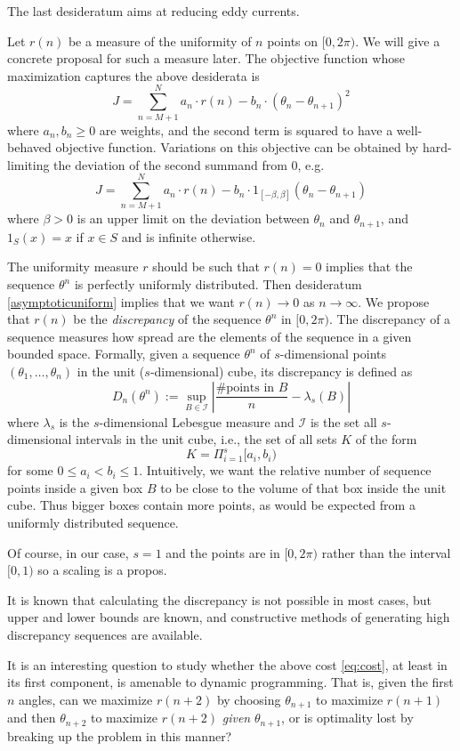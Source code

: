 The last desideratum aims at reducing eddy currents.

Let $r(n)$ be a measure of the uniformity of $n$ points on $[0,2\pi)$. 
We will give a concrete proposal for such a measure later.
The objective function whose maximization captures the above desiderata is 
\begin{equation}
\label{eq:cost}
J = \sum_{n=M+1}^{N}a_n\cdot r(n) - b_n \cdot (\theta_n - \theta_{n+1})^2
\end{equation}
where $a_n,b_n \geq 0$ are weights, and the second term is squared to have a well-behaved objective function. 
Variations on this objective can be obtained by hard-limiting the deviation of the second summand from 0, e.g. 
\[J = \sum_{n=M+1}^{N}a_n\cdot r(n) - b_n \cdot 1_{[-\beta,\beta]}  (\theta_n - \theta_{n+1})\]
where $\beta > 0$ is an upper limit on the deviation between $\theta_n$ and $\theta_{n+1}$, and $1_S(x) = x$ if $x \in S$ and is infinite otherwise.

The uniformity measure $r$ should be such that $r(n) = 0$ implies that the sequence $\theta^n$ is perfectly uniformly distributed.
Then desideratum \ref{asymptoticuniform} implies that we want $r(n) \rightarrow 0$ as $n \rightarrow \infty$.
We propose that $r(n)$ be the \emph{discrepancy} of the sequence $\theta^n$ in $[0,2\pi)$.
The discrepancy of a sequence measures how spread are the elements of the sequence in a given bounded space.
Formally, given a sequence $\theta^n $ of $s$-dimensional points $(\theta_1,\ldots,\theta_n)$ in the unit ($s$-dimensional) cube, its discrepancy is defined as 
\begin{equation}
D_n(\theta^n) := \sup_{B \in \mathcal{I}}\left|\frac{\#\textrm{points in }B}{n} - \lambda_s(B)\right|
\end{equation}
where $\lambda_s$ is the $s$-dimensional Lebesgue measure and $\mathcal{I}$ is the set all $s$-dimensional intervals in the unit cube, i.e., the set of all sets $K$ of the form
\[K = \Pi_{i=1}^s [a_i,b_i)\]
for some $0 \leq a_i < b_i \leq 1$.
Intuitively, we want the relative number of sequence points inside a given box $B$ to be close to the volume of that box inside the unit cube. 
Thus bigger boxes contain more points, as would be expected from a uniformly distributed sequence.

Of course, in our case, $s=1$ and the points are in $[0,2\pi)$ rather than the interval $[0,1)$ so a scaling is a propos.

It is known that calculating the discrepancy is not possible in most cases, but upper and lower bounds are known, and constructive methods of generating high discrepancy sequences are available.

It is an interesting question to study whether the above cost \eqref{eq:cost}, at least in its first component, is amenable to dynamic programming.
That is, given the first $n$ angles, can we maximize $r(n+2)$ by choosing $\theta_{n+1}$ to maximize $r(n+1)$ and then $\theta_{n+2}$ to maximize $r(n+2)$ \emph{given} $\theta_{n+1}$, or is optimality lost by breaking up the problem in this manner?